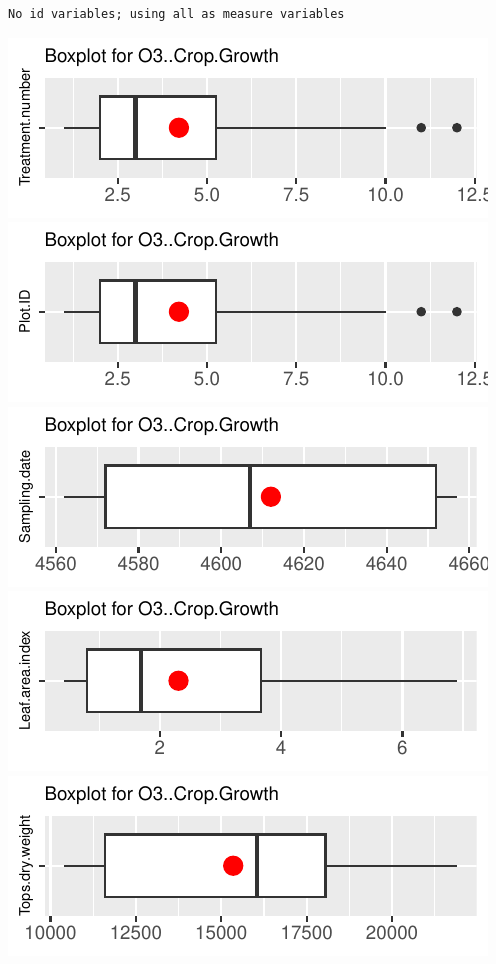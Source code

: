 \documentclass[
]{article}
\begin{document}
\begin{verbatim}
No id variables; using all as measure variables
\end{verbatim}

\includegraphics{FL_Crop_BMP_QA_single_dataset_files/figure-latex/check-content-of-sheets-33.pdf}
\includegraphics{FL_Crop_BMP_QA_single_dataset_files/figure-latex/check-content-of-sheets-34.pdf}
\includegraphics{FL_Crop_BMP_QA_single_dataset_files/figure-latex/check-content-of-sheets-35.pdf}
\includegraphics{FL_Crop_BMP_QA_single_dataset_files/figure-latex/check-content-of-sheets-36.pdf}
\includegraphics{FL_Crop_BMP_QA_single_dataset_files/figure-latex/check-content-of-sheets-37.pdf}
\end{document}
